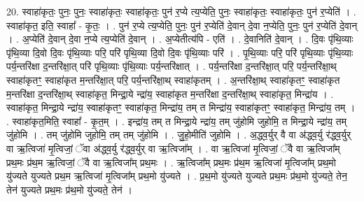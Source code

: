 \documentclass[17pt]{extarticle}
\begin{document}
20. स्वाहा॑कृतः॒ पुनः॒ पुनः॒ स्वाहा॑कृतः॒ स्वाहा॑कृतः॒ पुन॑ र॒प्ये त्य॒प्येति॒ पुनः॒ स्वाहा॑कृतः॒ स्वाहा॑कृतः॒ पुन॑ र॒प्येति॑ । . स्वाहा॑कृत॒ इति॒ स्वाहा᳚ - कृ॒तः॒ । . पुन॑ र॒प्ये त्य॒प्येति॒ पुनः॒ पुन॑ र॒प्येति॑ दे॒वान् दे॒वा न॒प्येति॒ पुनः॒ पुन॑ र॒प्येति॑ दे॒वान् । . अ॒प्येति॑ दे॒वान् दे॒वा न॒प्ये त्य॒प्येति॑ दे॒वान् । . अ॒प्येतीत्य॑पि - एति॑ । . दे॒वानिति॑ दे॒वान् । . दि॒वः पृ॑थि॒व्याः पृ॑थि॒व्या दि॒वो दि॒वः पृ॑थि॒व्याः परि॒ परि॑ पृथि॒व्या दि॒वो दि॒वः पृ॑थि॒व्याः परि॑ । . पृ॒थि॒व्याः परि॒ परि॑ पृथि॒व्याः पृ॑थि॒व्याः पर्य॒न्तरि॑क्षा द॒न्तरि॑क्षा॒त् परि॑ पृथि॒व्याः पृ॑थि॒व्याः पर्य॒न्तरि॑क्षात् । . पर्य॒न्तरि॑क्षा द॒न्तरि॑क्षा॒त् परि॒ पर्य॒न्तरि॑क्षा॒थ् स्वाहा॑कृतꣳ॒॒ स्वाहा॑कृत म॒न्तरि॑क्षा॒त् परि॒ पर्य॒न्तरि॑क्षा॒थ् स्वाहा॑कृतम् । . अ॒न्तरि॑क्षा॒थ् स्वाहा॑कृतꣳ॒॒ स्वाहा॑कृत म॒न्तरि॑क्षा द॒न्तरि॑क्षा॒थ् स्वाहा॑कृत॒ मिन्द्रा॒ये न्द्रा॑य॒ स्वाहा॑कृत म॒न्तरि॑क्षा द॒न्तरि॑क्षा॒थ् स्वाहा॑कृत॒ मिन्द्रा॑य । . स्वाहा॑कृत॒ मिन्द्रा॒ये न्द्रा॑य॒ स्वाहा॑कृतꣳ॒॒ स्वाहा॑कृत॒ मिन्द्रा॑य॒ तम् त मिन्द्रा॑य॒ स्वाहा॑कृतꣳ॒॒ स्वाहा॑कृत॒ मिन्द्रा॑य॒ तम् । . स्वाहा॑कृत॒मिति॒ स्वाहा᳚ - कृ॒त॒म् । . इन्द्रा॑य॒ तम् त मिन्द्रा॒ये न्द्रा॑य॒ तम् जु॑होमि जुहोमि॒ त मिन्द्रा॒ये न्द्रा॑य॒ तम् जु॑होमि । . तम् जु॑होमि जुहोमि॒ तम् तम् जु॑होमि । . जु॒हो॒मीति॑ जुहोमि । . अ॒द्ध्व॒र्युर् वै वा अ॑द्ध्व॒र्यु र॑द्ध्व॒र्युर् वा ऋ॒त्विजा॑ मृ॒त्विजां॒ ॅवा अ॑द्ध्व॒र्यु र॑द्ध्व॒र्युर् वा ऋ॒त्विजा᳚म् । . वा ऋ॒त्विजा॑ मृ॒त्विजां॒ ॅवै वा ऋ॒त्विजा᳚म् प्रथ॒मः प्र॑थ॒म ऋ॒त्विजां॒ ॅवै वा ऋ॒त्विजा᳚म् प्रथ॒मः । . ऋ॒त्विजा᳚म् प्रथ॒मः प्र॑थ॒म ऋ॒त्विजा॑ मृ॒त्विजा᳚म् प्रथ॒मो यु॑ज्यते युज्यते प्रथ॒म ऋ॒त्विजा॑ मृ॒त्विजा᳚म् प्रथ॒मो यु॑ज्यते । . प्र॒थ॒मो यु॑ज्यते युज्यते प्रथ॒मः प्र॑थ॒मो यु॑ज्यते॒ तेन॒ तेन॑ युज्यते प्रथ॒मः प्र॑थ॒मो यु॑ज्यते॒ तेन॑ । \newline
\end{document}
